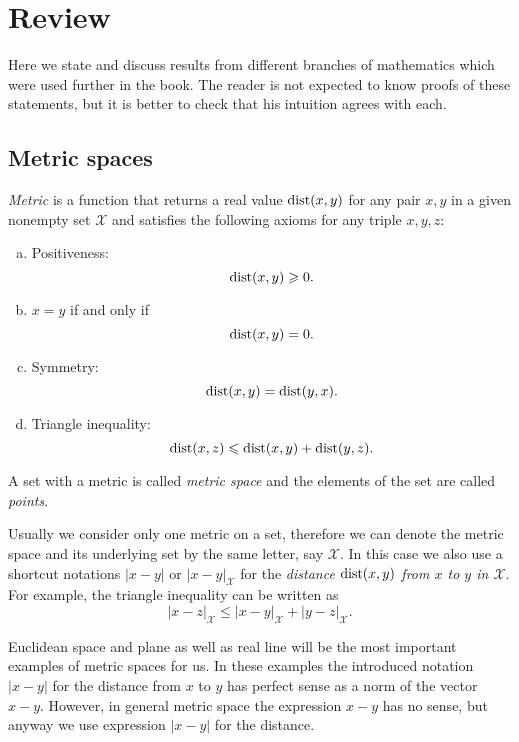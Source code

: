 \chapter{Review}

Here we state and discuss results from different branches of mathematics which were used further in the book.
The reader is not expected to know proofs of these statements, but it is better to check that his intuition agrees with each.  

\section{Metric spaces}\label{app:metric-spcaes}

\emph{Metric} is a function that returns a real value $\mathop{\rm dist}\nolimits(x,y)$ for any pair $x,y$ in a given nonempty set $\mathcal X$  and satisfies the following axioms for any triple $x,y,z$:
\begin{enumerate}[(a)]
\item\label{def:metric-space:a} Positiveness: 
$$\mathop{\rm dist}\nolimits(x,y)\geqslant 0.$$
\item\label{def:metric-space:b} $x=y$ if and only if 
$$\mathop{\rm dist}\nolimits(x,y)=0.$$
\item\label{def:metric-space:c} Symmetry: $$\mathop{\rm dist}\nolimits(x, y) = \mathop{\rm dist}\nolimits(y, x).$$
\item\label{def:metric-space:d} Triangle inequality: 
$$\mathop{\rm dist}\nolimits(x, z) \leqslant \mathop{\rm dist}\nolimits(x, y) + \mathop{\rm dist}\nolimits(y, z).$$
\end{enumerate}

A set with a metric is called \emph{metric space} and the elements of the set are called \emph{points}.

Usually we consider only one metric on a set, therefore we can denote the metric space and its underlying set by the same letter, say $\mathcal X$.
In this case we also use a shortcut notations $|x-y|$ or  $|x-y|_\mathcal X$ for the \emph{distance $\mathop{\rm dist}\nolimits(x,y)$ from $x$ to $y$ in $\mathcal X$}.
For example, the triangle inequality can be written as 
$$|x-z|_{\mathcal X}\le |x-y|_{\mathcal X}+|y-z|_{\mathcal X}.$$

Euclidean space and plane as well as real line will be the most important examples of metric spaces for us.
In these examples the introduced notation $|x-y|$ for the distance from $x$ to $y$ has perfect sense as a norm of the vector $x-y$.
However, in general metric space the expression $x-y$ has no sense, but anyway we use expression $|x-y|$ for the distance.

